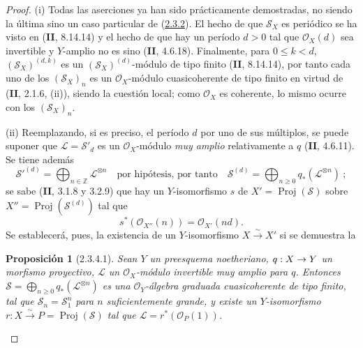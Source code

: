 \documentclass[10pt,oneside,openany]{book}
\theoremstyle{egaenv}\newtheorem*{env}{---}
\theoremstyle{egastatement}
\newtheorem*{proposition}{Proposición}
\theoremstyle{egadescription}
\newcommand{\oldpage}[2][]{\marginnote{\normalfont\scriptsize\textbf{#1}\,|\,#2}\ignorespaces}
\renewcommand{\leq}{\leqslant}
\renewcommand{\geq}{\geqslant}
\renewcommand{\to}{\mathchoice{\longrightarrow}{\rightarrow}{\rightarrow}{\rightarrow}}
\begin{document}
\begin{proof}
(i) Todas las aserciones ya han sido prácticamente demostradas, no siendo la última sino un caso particular de (\hyperref[III.2.3.2-fr]{2.3.2}). El hecho de que $\mathcal S_X$ es periódico se ha visto en (\textbf{II}, 8.14.14) y el hecho de que hay un período $d>0$ tal que $\mathcal O_X(d)$ sea invertible y $Y$-amplio no es sino (\textbf{II}, 4.6.18). Finalmente, para $0\leq k<d$, $(\mathcal S_X)^{(d,k)}$ es un $(\mathcal S_X)^{(d)}$-módulo de tipo finito (\textbf{II}, 8.14.14), por tanto cada uno de los $(\mathcal S_X)_n$ es un $\mathcal O_X$-módulo cuasicoherente de tipo finito en virtud de (\textbf{II}, 2.1.6, (ii)), siendo la cuestión local; como $\mathcal O_X$ es coherente, lo mismo ocurre con los $(\mathcal S_X)_n$.

(ii) Reemplazando, si es preciso, el período $d$ por uno de sus múltiplos, se puede suponer que $\mathcal L=\mathcal S'_d$ es un $\mathcal O_X$-módulo \emph{muy amplio} relativamente a $q$ (\textbf{II}, 4.6.11). Se tiene además
\[
\mathcal S'^{(d)}=\bigoplus_{n\in\mathbb Z}\mathcal L^{\otimes n}
\quad\text{por hipótesis, por tanto}\quad
\mathcal S^{(d)}=\bigoplus_{n\geq0}q_*(\mathcal L^{\otimes n})~;
\]
se sabe (\textbf{II}, 3.1.8 y 3.2.9) que hay un $Y$-isomorfismo $s$ de $X'=\operatorname{Proj}(\mathcal S)$ sobre $X''=\operatorname{Proj}(\mathcal S^{(d)})$ tal que
\oldpage[III]{105}
\[
s^*(\mathcal O_{X''}(n))=\mathcal O_{X'}(nd).
\]
Se establecerá, pues, la existencia de un $Y$-isomorfismo $X\xrightarrow{\sim}X'$ si se demuestra la

\begin{proposition}[2.3.4.1]
\label{III.2.3.4.1-fr}
Sean $Y$ un preesquema noetheriano, $q:X\to Y$ un morfismo proyectivo, $\mathcal L$ un $\mathcal O_X$-módulo invertible muy amplio para $q$. Entonces $\mathcal S=\bigoplus_{n\geq0}q_*(\mathcal L^{\otimes n})$ es una $\mathcal O_Y$-álgebra graduada cuasicoherente de tipo finito, tal que $\mathcal S_n=\mathcal S_1^n$ para $n$ suficientemente grande, y existe un $Y$-isomorfismo $r:X\xrightarrow{\sim}P=\operatorname{Proj}(\mathcal S)$ tal que $\mathcal L=r^*(\mathcal O_P(1))$.
\end{proposition}


\end{proof}
\end{document}
